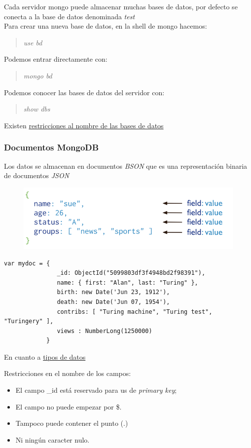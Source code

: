 \documentclass[4paper]{article}
\begin{document}
Cada servidor mongo puede almacenar muchas bases de datos, por defecto se conecta a la base de datos denominada \emph{test}\\
Para crear una nueva base de datos, en la shell de mongo hacemos:
\begin{quote}
\textit{use bd
}\end{quote}
Podemos entrar directamente con:
\begin{quote}
\textit{mongo bd}
\end{quote}
Podemos conocer las bases de datos del servidor con:
\begin{quote}
\textit{show dbs}
\end{quote}
Existen \href{https://docs.mongodb.com/manual/reference/limits/#restrictions-on-db-names}{restricciones al nombre de las bases de datos}

\subsubsection{Documentos MongoDB}
Los datos se almacenan en documentos \emph{BSON} que es una representación binaria  de documentos \emph{JSON}
\begin{figure}[H]
\includegraphics[scale=0.5]{documentos.png}
\end{figure}
\begin{lstlisting}
var mydoc = {
               _id: ObjectId("5099803df3f4948bd2f98391"),
               name: { first: "Alan", last: "Turing" },
               birth: new Date('Jun 23, 1912'),
               death: new Date('Jun 07, 1954'),
               contribs: [ "Turing machine", "Turing test", "Turingery" ],
               views : NumberLong(1250000)
            }
\end{lstlisting}
En cuanto a \href{https://docs.mongodb.com/manual/reference/bson-types/}{tipos de datos}

Restricciones en el nombre de los campos:
\begin{itemize}
\item El campo \_id está reservado para us de \emph{primary key}; 
\item El campo no puede empezar por \$.
\item Tampoco puede contener el punto (.)
\item Ni ningún caracter nulo.
\end{itemize}
\end{document}
